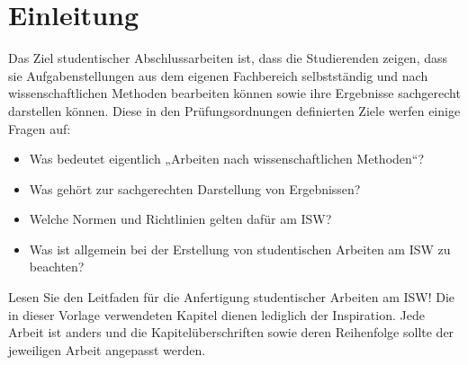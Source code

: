 \chapter{Einleitung}

Das Ziel studentischer Abschlussarbeiten ist, dass die Studierenden zeigen, dass sie Aufgabenstellungen aus dem eigenen Fachbereich selbstständig und nach wissenschaftlichen Methoden bearbeiten können sowie ihre Ergebnisse sachgerecht darstellen können. Diese in den Prüfungsordnungen definierten Ziele werfen einige Fragen auf:

\begin{itemize}
\item Was bedeutet eigentlich „Arbeiten nach wissenschaftlichen Methoden“?
\item Was gehört zur sachgerechten Darstellung von Ergebnissen?
\item Welche Normen und Richtlinien gelten dafür am ISW?
\item Was ist allgemein bei der Erstellung von studentischen Arbeiten am ISW zu beachten?
\end{itemize}

Lesen Sie den Leitfaden für die Anfertigung studentischer Arbeiten am ISW! Die in dieser Vorlage verwendeten Kapitel dienen lediglich der Inspiration. Jede Arbeit ist anders und die Kapitelüberschriften sowie deren Reihenfolge sollte der jeweiligen Arbeit angepasst werden.
